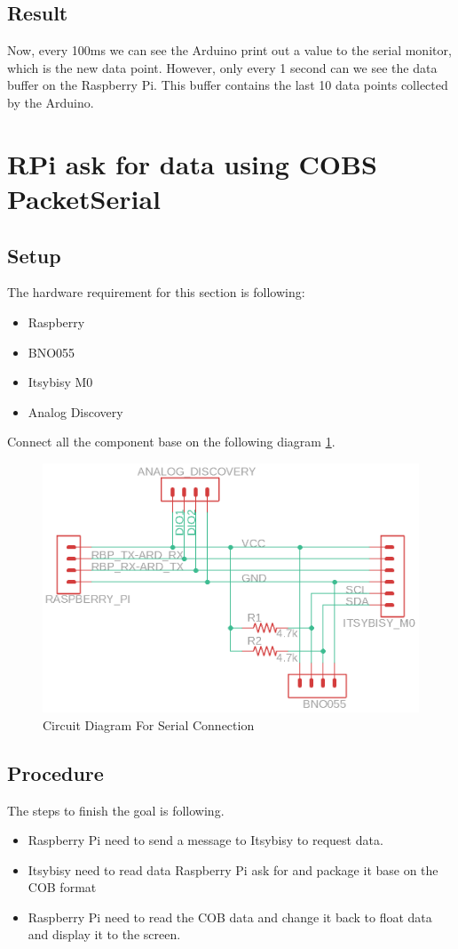 \documentclass{article}
\begin{document}
	\subsection{Result}
	Now, every 100ms we can see the Arduino print out a value to the serial monitor, which is the new data point. However, only every 1 second can we see the data buffer on the Raspberry Pi. This buffer contains the last 10 data points collected by the Arduino.
	
	\clearpage
	\section{RPi ask for data using COBS PacketSerial}
	\subsection{Setup}
	The hardware requirement for this section is following:
	\begin{itemize}
		\item Raspberry
		\item BNO055
		\item Itsybisy M0
		\item Analog Discovery
	\end{itemize}
	Connect all the component base on the following diagram \ref{CNN2}.
	\begin{figure}[hb]
		\includegraphics[width=\textwidth]{img/Lab3_SerialConnection.png}
		\caption{Circuit Diagram For Serial Connection} 
		\label{CNN2}
	\end{figure}
	\subsection{Procedure}
	The steps to finish the goal is following.
	\begin{itemize}
		\item Raspberry Pi need to send a message to Itsybisy to request data.
		\item Itsybisy need to read data Raspberry Pi ask for and package it base on the COB format
		\item Raspberry Pi need to read the COB data and change it back to float data and display it to the screen.
	\end{itemize}
\end{document}
